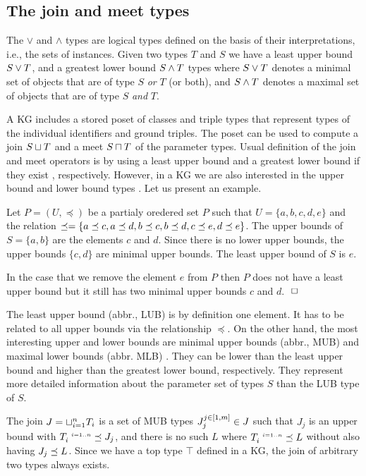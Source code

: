 \documentclass[runningheads]{llncs}
\newcommand{\s}{\scriptscriptstyle\ \,}
\newcommand{\finbox}{\phantom{.}\hfill\Box}
\begin{document}
\subsection{The join and meet types\label{sec:join-meet-types}}

The $\lor$ and $\land$ types are logical types defined on the basis of
their interpretations, i.e., the sets of instances. Given two types
$T$ and $S$ we have a least upper bound $S\lor\/T$, and a greatest
lower bound $S\land\/T$ types where $S\lor\/T$ denotes a minimal set
of objects that are of type $S$ \emph{or} $T$ (or both), and
$S\land\/T$ denotes a maximal set of objects that are of type $S$
\emph{and} $T$.

A KG includes a stored poset of classes and triple types that
represent types of the individual identifiers and ground triples. The
poset can be used to compute a join $S\sqcup\/T$ and a meet
$S\sqcap\/T$ of the parameter types. Usual definition of the join and
meet operators is by using a least upper bound and a greatest lower
bound if they exist \cite{Pierce2002}, respectively. However, in a KG
we are also interested in the upper bound and lower bound types
\cite{DaveyPriestley2002}. Let us present an example.

\begin{example}
  Let $P=(U,\preceq)$ be a partialy oredered set $P$ such that
  $U=\{a,b,c,d,e\}$ and the relation
  $\preceq=\{a\preceq\/c,a\preceq\/d,b\preceq\/c,b\preceq\/d,c\preceq\/e,d\preceq\/e\}$.
  The upper bounds of $S=\{a,b\}$ are the elements $c$ and $d$. Since
  there is no lower upper bounds, the upper bounds $\{c,d\}$ are
  minimal upper bounds. The least upper bound of $S$ is $e$.

  In the case that we remove the element $e$ from $P$ then $P$ does
  not have a least upper bound but it still has two minimal upper
  bounds $c$ and $d$. $\finbox$
\end{example}

The least upper bound (abbr., LUB) is by definition one element. It has
to be related to all upper bounds via the relationship $\preceq$. On
the other hand, the most interesting upper and lower bounds are
minimal upper bounds (abbr., MUB) and maximal lower bounds (abbr. MLB)
\cite{Knudstorp2024}. They can be lower than the least upper bound and
higher than the greatest lower bound, respectively. They represent
more detailed information about the parameter set of types $S$ than
the LUB type of $S$.

The join $J=\sqcup_{i=1}^n\/T_i$ is a set of MUB types
$J_j^{j\in[1,m]}\in\/J$ such that $J_j$ is an upper bound with
$T_i^{\s\/i=1..n}\preceq\/J_j$, and there is no such $L$ where
$T_i^{\s\/i=1..n}\preceq\/L$ without also having $J_j\preceq\/L$. Since
we have a top type $\top$ defined in a KG, the join of arbitrary two
types always exists.
\end{document}
